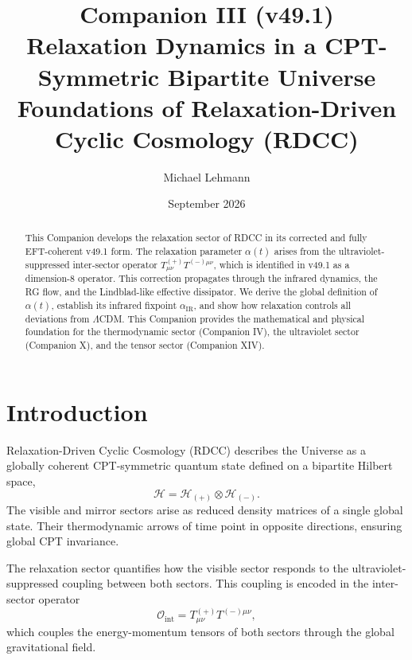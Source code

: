 \documentclass[11pt,a4paper]{article}
\title{\textbf{Companion III (v49.1)}\\[0.2cm]
\textbf{Relaxation Dynamics in a CPT-Symmetric Bipartite Universe}\\[0.2cm]
\large Foundations of Relaxation-Driven Cyclic Cosmology (RDCC)}
\author[1]{Michael Lehmann}
\affil[1]{\small Independent Researcher, Relaxation-Driven Cyclic Cosmology (RDCC)\\
\texttt{mi.lehmann@gmx.de}}
\date{September 2026}
\begin{document}
\maketitle


\begin{abstract}
This Companion develops the relaxation sector of RDCC in its corrected and
fully EFT-coherent v49.1 form. The relaxation parameter $\alpha(t)$ arises
from the ultraviolet-suppressed inter-sector operator
$T^{(+)}_{\mu\nu}T^{(-)\mu\nu}$, which is identified in v49.1 as a
dimension-8 operator. This correction propagates through the infrared dynamics,
the RG flow, and the Lindblad-like effective dissipator. We derive the global
definition of $\alpha(t)$, establish its infrared fixpoint
$\alpha_{\mathrm{IR}}$, and show how relaxation controls all deviations from
$\Lambda$CDM. This Companion provides the mathematical and physical foundation
for the thermodynamic sector (Companion IV), the ultraviolet sector (Companion X),
and the tensor sector (Companion XIV).
\end{abstract}

\tableofcontents
\newpage

\section{Introduction}

Relaxation-Driven Cyclic Cosmology (RDCC) describes the Universe as a globally
coherent CPT-symmetric quantum state defined on a bipartite Hilbert space,
\begin{equation}
\mathcal{H} = \mathcal{H}_{(+)} \otimes \mathcal{H}_{(-)}.
\end{equation}
The visible and mirror sectors arise as reduced density matrices of a single
global state. Their thermodynamic arrows of time point in opposite directions,
ensuring global CPT invariance.

The relaxation sector quantifies how the visible sector responds to the
ultraviolet-suppressed coupling between both sectors. This coupling is encoded
in the inter-sector operator
\begin{equation}
\mathcal{O}_{\mathrm{int}} = T^{(+)}_{\mu\nu} T^{(-)\mu\nu},
\end{equation}
which couples the energy-momentum tensors of both sectors through the global
gravitational field.
\end{document}
